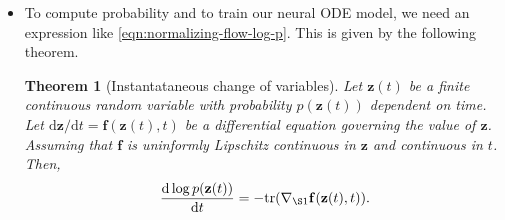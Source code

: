 \documentclass[10pt]{article}
\newtheorem{theorem}[lemma]{Theorem}
\newcommand{\dee}{\mathrm{d}}
\newcommand{\ve}[1]{\mathbf{#1}}
\newcommand{\tr}{\mathrm{tr}}
\begin{document}
\begin{itemize}
  \item To compute probability and to train our neural ODE model, we need an expression like \eqref{eqn:normalizing-flow-log-p}. This is given by the following theorem.
  \begin{theorem}[Instantataneous change of variables]
    Let $\ve{z}(t)$ be a finite continuous random variable with probability $p(\ve{z}(t))$ dependent on time. Let $\dee \ve{z} / \dee t = \ve{f}(\ve{z}(t), t)$ be a differential equation governing the value of $\ve{z}$. Assuming that $\ve{f}$ is uninformly Lipschitz continuous in $\ve{z}$ and continuous in $t$. Then,
    \begin{align*}
      \frac{\dee \log p(\ve{z}(t))}{\dee t} = -\tr(\nabla_{\S1} \ve{f}(\ve{z}(t), t)).
    \end{align*}
  \end{theorem}
\end{itemize}


  
\end{document}
